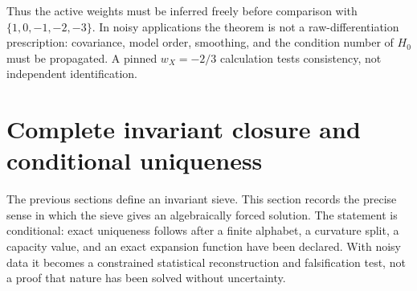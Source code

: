\documentclass[aps,prd,reprint,nofootinbib,superscriptaddress,floatfix]{revtex4-2}
\numberwithin{equation}{section}
\theoremstyle{definition}
\theoremstyle{plain}
\begin{document}
Thus the active weights must be inferred freely before comparison with \(\{1,0,-1,-2,-3\}\).  In noisy applications the theorem is not a raw-differentiation prescription: covariance, model order, smoothing, and the condition number of \(H_0\) must be propagated.  A pinned \(w_X=-2/3\) calculation tests consistency, not independent identification.



\section{Complete invariant closure and conditional uniqueness}\label{sec:complete-closure}

The previous sections define an invariant sieve.  This section records the
precise sense in which the sieve gives an algebraically forced solution.
The statement is conditional: exact uniqueness follows after a finite
alphabet, a curvature split, a capacity value, and an exact expansion
function have been declared.  With noisy data it becomes a constrained
statistical reconstruction and falsification test, not a proof that nature
has been solved without uncertainty.
\end{document}
